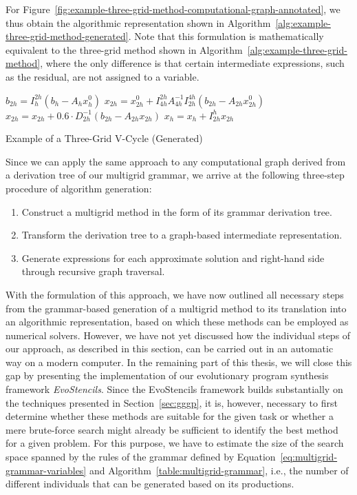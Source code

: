 For Figure~\ref{fig:example-three-grid-method-computational-graph-annotated}, we thus obtain the algorithmic representation shown in Algorithm~\ref{alg:example-three-grid-method-generated}.
Note that this formulation is mathematically equivalent to the three-grid method shown in Algorithm~\ref{alg:example-three-grid-method}, where the only difference is that certain intermediate expressions, such as the residual, are not assigned to a variable.
\begin{algorithm}
	\begin{algorithmic}[1]
		\State $ b_{2h} = I_{h}^{2h} \left(b_{h} - A_h x_{h}^0 \right)$
		\State $ x_{2h} = x^0_{2h} + I_{4h}^{2h} A_{4h}^{-1} I_{2h}^{4h} \left(b_{2h} - A_{2h} x^0_{2h}\right)$
		\State $ x_{2h} = x_{2h} + 0.6 \cdot D_{2h}^{-1} \left(b_{2h} - A_{2h} x_{2h}\right)$
		\State $x_{h} = x_{h}  + I_{2h}^h x_{2h}$
	\end{algorithmic}
	\caption{Example of a Three-Grid V-Cycle (Generated)}
	\label{alg:example-three-grid-method-generated}
\end{algorithm}
Since we can apply the same approach to any computational graph derived from a derivation tree of our multigrid grammar, we arrive at the following three-step procedure of algorithm generation:
\begin{enumerate}
	\item Construct a multigrid method in the form of its grammar derivation tree.
	\item Transform the derivation tree to a graph-based intermediate representation.
	\item Generate expressions for each approximate solution and right-hand side through recursive graph traversal.
\end{enumerate}
With the formulation of this approach, we have now outlined all necessary steps from the grammar-based generation of a multigrid method to its translation into an algorithmic representation, based on which these methods can be employed as numerical solvers.
However, we have not yet discussed how the individual steps of our approach, as described in this section, can be carried out in an automatic way on a modern computer.
In the remaining part of this thesis, we will close this gap by presenting the implementation of our evolutionary program synthesis framework \emph{EvoStencils}.
Since the EvoStencils framework builds substantially on the techniques presented in Section~\ref{sec:gggp}, it is, however, necessary to first determine whether these methods are suitable for the given task or whether a mere brute-force search might already be sufficient to identify the best method for a given problem.
For this purpose, we have to estimate the size of the search space spanned by the rules of the grammar defined by Equation~\eqref{eq:multigrid-grammar-variables} and Algorithm~\ref{table:multigrid-grammar}, i.e., the number of different individuals that can be generated based on its productions.

